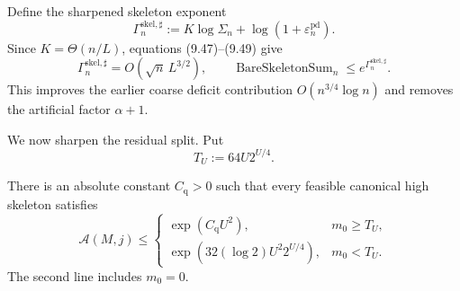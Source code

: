 Define the sharpened skeleton exponent
\begin{equation*}
  \Gamma_n^{\mathrm{skel},\sharp}
  :=K\log\Sigma_n+
    \log\!\left(1+\varepsilon_n^{\mathrm{pd}}\right).
  \tag{9.50}
\end{equation*}
Since $K=\Theta(n/L)$, equations (9.47)--(9.49) give
\begin{equation*}
  \Gamma_n^{\mathrm{skel},\sharp}
  =O\!\left(\sqrt n\,L^{3/2}\right),
  \qquad
  \operatorname{BareSkeletonSum}_n
  \le e^{\Gamma_n^{\mathrm{skel},\sharp}}.
  \tag{9.51}
\end{equation*}
This improves the earlier coarse deficit contribution
$O(n^{3/4}\log n)$ and removes the artificial factor $\alpha+1$.

We now sharpen the residual split.  Put
\begin{equation*}
  T_U:=64U2^{U/4}.
  \tag{9.52}
\end{equation*}

\begin{proposition}
\label{prop:critical-quarter-residual-attachment-v4}
There is an absolute constant $C_\mathrm{q}>0$ such that every feasible
canonical high skeleton satisfies
\begin{equation*}
  \mathcal A(M,j)
  \le
  \begin{cases}
    \exp(C_\mathrm{q}U^2),&m_0\ge T_U,\\[2mm]
    \displaystyle\exp\!\left(32(\log 2)U^2 2^{U/4}\right),&m_0<T_U.
  \end{cases}
  \tag{9.53}
\end{equation*}
The second line includes $m_0=0$.
\end{proposition}

